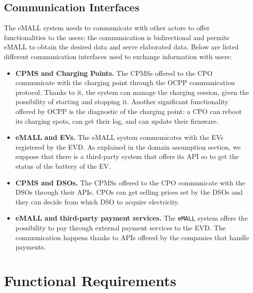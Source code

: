 \subsection{Communication Interfaces}
\label{subsec:communication_interfaces}%
The eMALL system needs to communicate with other actors to offer functionalities to the users;
the communication is bidirectional and permits eMALL to obtain the desired data and serve elaborated data.
Below are listed different communication interfaces used to exchange information with users:
\begin{itemize}
    \item \textbf{CPMS and Charging Points.} The CPMSs offered to the CPO communicate with the charging point
    through the OCPP communication protocol.
    Thanks to it, the system can manage the charging session, given the possibility of starting and stopping it.
    Another significant functionality offered by OCPP is the diagnostic of the charging point:
    a CPO can reboot its charging spots, can get their log, and can update their firmware.
    \item \textbf{eMALL and EVs.} The eMALL system communicates with the EVs registered by the EVD\@.
    As explained in the domain assumption section, we suppose that there is a third-party system that offers its API
    so to get the status of the battery of the EV\@.
    \item \textbf{CPMS and DSOs.} The CPMSs offered to the CPO communicate with the DSOs through their APIs.
    CPOs can get selling prices set by the DSOs and they can decide from which DSO to acquire electricity.
    \item \textbf{eMALL and third-party payment services.} The \verb|eMALL| system offers the possibility to pay through
    external payment services to the EVD. The communication happens thanks to APIs offered by the companies that handle payments.
\end{itemize}


\section{Functional Requirements}
\label{sec:functional_requirements}%

